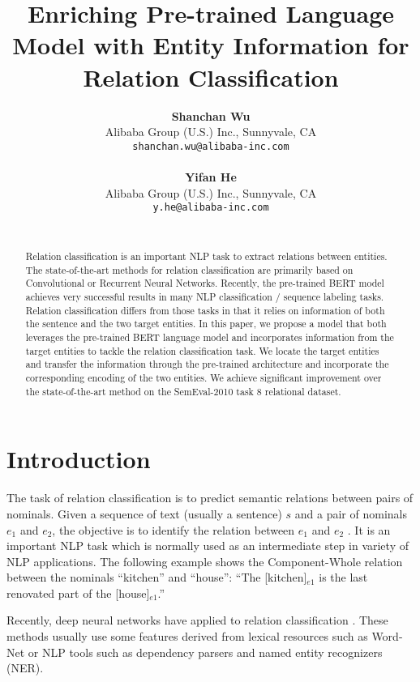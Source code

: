 \documentclass[11pt]{article}
\title{
	Enriching Pre-trained Language Model with Entity Information for Relation Classification
}
\author{\textbf{Shanchan Wu} \\
	Alibaba Group (U.S.) Inc., Sunnyvale, CA   \\
{\tt shanchan.wu@alibaba-inc.com} \\ \\
	\textbf{Yifan He} \\
	Alibaba Group (U.S.) Inc., Sunnyvale, CA  \\
{\tt y.he@alibaba-inc.com} \\
	\\
}
\date{}
\providecommand{\cite}[1]{\citeauthoryear{#1}}
\renewcommand{\cite}{\citep}
\begin{document}
\maketitle



\begin{abstract}
Relation classification is an important NLP task
to extract relations between entities. The 
state-of-the-art methods for relation classification are primarily
based on Convolutional or Recurrent Neural Networks. 
Recently, the pre-trained BERT model
achieves very successful results in many NLP classification  / sequence labeling tasks. Relation classification differs from
those tasks in that it relies on information of both the
sentence and the two target entities.
In this
paper, we propose a model that both leverages the pre-trained BERT language model and incorporates information from the target entities to tackle the relation classification task. 
We locate the target entities and transfer the information through the pre-trained architecture
and incorporate the corresponding encoding of the two entities.
We achieve  significant improvement over the state-of-the-art method on the SemEval-2010 task 8 relational dataset. 
\end{abstract}

 

\section{Introduction}

The task of relation classification is to predict semantic relations between pairs of nominals. 
Given a sequence of text (usually a sentence) $s$ and a pair of nominals $e_1$ and $e_2$, the objective
is to identify the relation between $e_1$ and $e_2$ \cite{Hendrickx2010_semeval}. 
It is an important NLP task which is normally
used as an intermediate step in variety of NLP
applications. 
The following example shows the
Component-Whole relation between the nominals
``kitchen'' and ``house'':  ``The [kitchen]$_{e1}$ is the last renovated part of the [house]$_{e1}$.''

Recently, deep neural networks have applied to relation classification 
\cite{Socher_EMNLP_2012,Zeng_coling_2014,Yu_NIPS_Worksho_2014,Nogueira_ACL_2015,Huang_COLING_2016,Joohong_Arxiv_2019}.
These methods usually use  some features
derived from lexical resources such as Word-Net or NLP tools such as dependency parsers and
named entity recognizers (NER).
\end{document}
